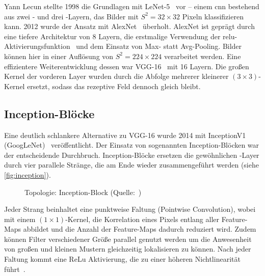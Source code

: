 Yann Lecun stellte 1998 die Grundlagen mit LeNet-5~\cite{Lecun98} vor -- einem \gls{cnn} bestehend aus zwei \conv- und drei \fc-Layern, das Bilder mit $S^2=32 \times 32$ Pixeln klassifizieren kann.
2012 wurde der Ansatz mit AlexNet~\cite{Krizhevsky12} überholt.
AlexNet ist geprägt durch eine tiefere Architektur von 8 Layern, die erstmalige Verwendung der \gls{relu}-Aktivierungsfunktion~\cite{jarrett09} und dem Einsatz von Max- statt Avg-Pooling.
Bilder können hier in einer Auflösung von $S^2=224 \times 224$ verarbeitet werden.
Eine effizientere Weiterentwicklung dessen war VGG-16~\cite{Simonyan15} mit 16 Layern.
Die großen Kernel der vorderen Layer wurden durch die Abfolge mehrerer kleinerer $(3 \times 3)$-Kernel ersetzt, sodass das rezeptive Feld dennoch gleich bleibt.


\subsection{Inception-Blöcke}
\label{subsec:inception-bloecke}

Eine deutlich schlankere Alternative zu VGG-16 wurde 2014 mit InceptionV1 (GoogLeNet)~\cite{Szegedy14} veröffentlicht.
Der Einsatz von sogenannten Inception-Blöcken war der entscheidende Durchbruch.
Inception-Blöcke ersetzen die gewöhnlichen \conv-Layer durch vier parallele Stränge, die am Ende wieder zusammengeführt werden (siehe \autoref{fig:inception}).

\begin{figure}[hb!]
    \centering
    \caption{Topologie: Inception-Block (Quelle:~\cite{Karim19})}
    \label{fig:inception}
\end{figure}

Jeder Strang beinhaltet eine punktweise Faltung (Pointwise Convolution), wobei mit einem $(1 \times 1)$-Kernel, die Korrelation eines Pixels entlang aller Feature-Maps abbildet und die Anzahl der Feature-Maps dadurch reduziert wird.
Zudem können Filter verschiedener Größe parallel genutzt werden um die Anwesenheit von großen und kleinen Mustern gleichzeitig lokalisieren zu können.
Nach jeder Faltung kommt eine ReLu Aktivierung, die zu einer höheren Nichtlinearität führt~\cite{Pointer19}.

